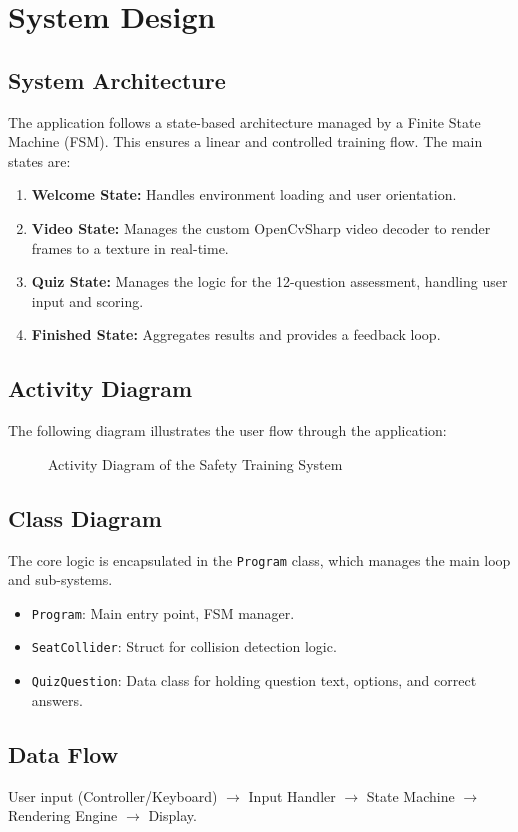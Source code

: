 \chapter{System Design}

\section{System Architecture}
The application follows a state-based architecture managed by a Finite State Machine (FSM). This ensures a linear and controlled training flow. The main states are:
\begin{enumerate}
    \item \textbf{Welcome State:} Handles environment loading and user orientation.
    \item \textbf{Video State:} Manages the custom OpenCvSharp video decoder to render frames to a texture in real-time.
    \item \textbf{Quiz State:} Manages the logic for the 12-question assessment, handling user input and scoring.
    \item \textbf{Finished State:} Aggregates results and provides a feedback loop.
\end{enumerate}

\section{Activity Diagram}
The following diagram illustrates the user flow through the application:

\begin{figure}[h]
    \centering
    \caption{Activity Diagram of the Safety Training System}
    \label{fig:activity_diagram}
\end{figure}

\section{Class Diagram}
The core logic is encapsulated in the \texttt{Program} class, which manages the main loop and sub-systems.
\begin{itemize}
    \item \texttt{Program}: Main entry point, FSM manager.
    \item \texttt{SeatCollider}: Struct for collision detection logic.
    \item \texttt{QuizQuestion}: Data class for holding question text, options, and correct answers.
\end{itemize}

\section{Data Flow}
User input (Controller/Keyboard) $\rightarrow$ Input Handler $\rightarrow$ State Machine $\rightarrow$ Rendering Engine $\rightarrow$ Display.
